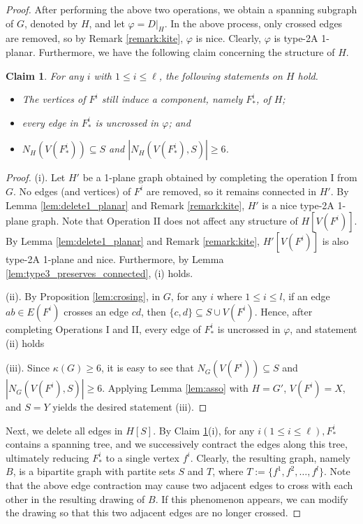 \documentclass[12pt,a4paper]{article}
\newtheorem{claim}{Claim}[section]
\begin{document}
\begin{proof}
After performing the above two operations, we obtain a spanning subgraph of $G$, denoted by $H$, and let $\varphi=D|_{H}$. 
In the above process, only crossed edges are removed, so by Remark \ref{remark:kite}, $\varphi$ is  nice. Clearly, $\varphi$ is type-2A 1-planar.  Furthermore, we have the following claim concerning the structure of $H$.

\begin{claim}\label{claim:H}
For any $i$ with $1\le i \le \ell$, the following statements on $H$ hold.
\begin{itemize}
\item[(i)]  The vertices of  $F^i$ still induce a  component, namely $F^i_*$, of $H$;
\item[(ii)]  every edge in $F^i_*$ is uncrossed in $\varphi$; and
\item[(iii)] $N_{H}(V(F^i_*)) \subseteq S$ and $\left|N_{H}(V(F^i_*),S)\right| \geq 6$.
\end{itemize}


\end{claim}

\begin{proof}(i). Let $H'$ be a 1-plane graph obtained by completing the operation I from $G$. No  edges (and vertices) of $F^i$ are removed, so it remains connected in $H'$.  By Lemma \ref{lem:delete1_planar} and Remark \ref{remark:kite}, $H'$ is a nice type-2A 1-plane graph. Note that Operation II does not affect any structure of $H[V(F^i)]$. By Lemma \ref{lem:delete1_planar} and Remark \ref{remark:kite}, $H'[V(F^i)]$ is also type-2A 1-plane and nice.
 Furthermore, by Lemma \ref{lem:type3_preserves_connected}, (i) holds. 

(ii). By  Proposition \ref{lem:crosing}, in $G$, for any $i$ where $1 \le i \le l$, if an edge $ab \in E(F^i)$ crosses an edge $cd$, then $\{c,d\} \subseteq S\cup V(F^i)$. Hence, after completing Operations I and II, every edge of $F^i_*$ is uncrossed in $\varphi$, and statement (ii) holds
 
 (iii). Since $\kappa(G)\ge 6$, it is easy to see that $N_{G}(V(F^i)) \subseteq S$ and $\left|N_G(V(F^i),S)\right| \geq 6$.  Applying Lemma \ref{lem:asso} with $H = G'$, $V(F^i) = X$, and $S = Y$ yields the desired statement (iii).
\end{proof}




Next, we delete all edges in $H[S]$.  By Claim \ref{claim:H}(i), for any $i(1 \leq i \leq \ell), F_*^i$ contains a spanning tree, and we successively contract the edges along this tree, ultimately reducing $F_*^i$ to a single vertex $f^i$.  
 Clearly, the resulting graph, namely $B$, is a bipartite graph with partite sets $S$ and $T$, where $T := \{f^1, f^2, \dots, f^l\}$.
 Note that the above edge contraction may cause two adjacent edges to cross with each other in the resulting  drawing of $B$. If this phenomenon appears, we can modify the drawing so that this two adjacent edges are no longer crossed.




\end{proof}
\end{document}
